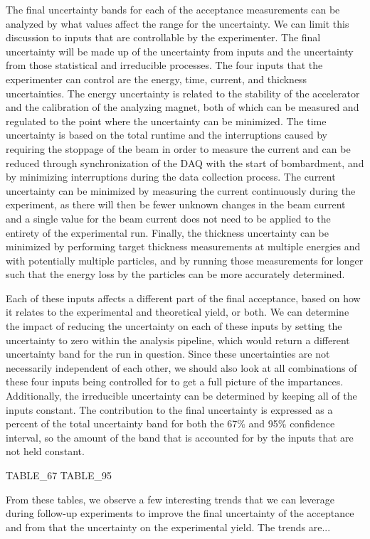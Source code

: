 The final uncertainty bands for each of the acceptance measurements can
be analyzed by what values affect the range for the uncertainty. We can
limit this discussion to inputs that are controllable by the
experimenter. The final uncertainty will be made up of the uncertainty
from inputs and the uncertainty from those statistical and irreducible
processes. The four inputs that the experimenter can control are the
energy, time, current, and thickness uncertainties. The energy
uncertainty is related to the stability of the accelerator and the
calibration of the analyzing magnet, both of which can be measured and
regulated to the point where the uncertainty can be minimized. The time
uncertainty is based on the total runtime and the interruptions caused
by requiring the stoppage of the beam in order to measure the current
and can be reduced through synchronization of the DAQ with the start of
bombardment, and by minimizing interruptions during the data collection
process. The current uncertainty can be minimized by measuring the
current continuously during the experiment, as there will then be fewer
unknown changes in the beam current and a single value for the beam
current does not need to be applied to the entirety of the experimental
run. Finally, the thickness uncertainty can be minimized by performing
target thickness measurements at multiple energies and with potentially
multiple particles, and by running those measurements for longer such
that the energy loss by the particles can be more accurately determined.

Each of these inputs affects a different part of the final acceptance,
based on how it relates to the experimental and theoretical yield, or
both. We can determine the impact of reducing the uncertainty on each of
these inputs by setting the uncertainty to zero within the analysis
pipeline, which would return a different uncertainty band for the run in
question. Since these uncertainties are not necessarily independent of
each other, we should also look at all combinations of these four inputs
being controlled for to get a full picture of the impartances.
Additionally, the irreducible uncertainty can be determined by keeping
all of the inputs constant. The contribution to the final uncertainty is
expressed as a percent of the total uncertainty band for both the 67\%
and 95\% confidence interval, so the amount of the band that is
accounted for by the inputs that are not held constant.

TABLE_67
TABLE_95

From these tables, we observe a few interesting trends that we can
leverage during follow-up experiments to improve the final uncertainty
of the acceptance and from that the uncertainty on the experimental
yield. The trends are...

